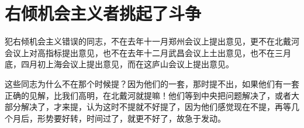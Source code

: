 \section[右倾机会主义者挑起了斗争（一九五九年八月十六日）]{右倾机会主义者挑起了斗争}


犯右倾机会主义错误的同志，不在去年十一月郑州会议上提出意见，更不在北戴河会议上对高指标提出意见，也不在去年十二月武昌会议上土出意见，也不在三月底，四月初上海会议上提出意见，而在这庐山会议上提出意见。

这些同志为什么不在那个时候提？因为他们的一套，那时提不出，如果他们有一套正确的见解，比我们高明，在北戴河就提嘛！他们等到中央把问题解决了，或者大部分解决了，才来提，认为这时不提就不好提了，因为他们感觉现在不提，再等几个月后，形势要好转，时间过了，就更不好了，故急于发动。


